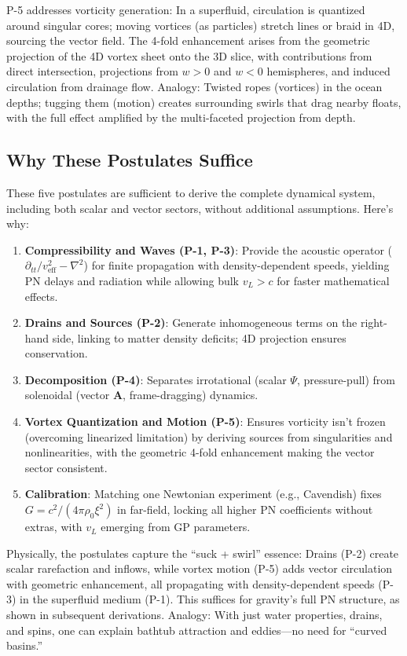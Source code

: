 \documentclass{article}
\begin{document}
P-5 addresses vorticity generation: In a superfluid, circulation is quantized around singular cores; moving vortices (as particles) stretch lines or braid in 4D, sourcing the vector field. The 4-fold enhancement arises from the geometric projection of the 4D vortex sheet onto the 3D slice, with contributions from direct intersection, projections from $w>0$ and $w<0$ hemispheres, and induced circulation from drainage flow. Analogy: Twisted ropes (vortices) in the ocean depths; tugging them (motion) creates surrounding swirls that drag nearby floats, with the full effect amplified by the multi-faceted projection from depth.

\subsection{Why These Postulates Suffice}

These five postulates are sufficient to derive the complete dynamical system, including both scalar and vector sectors, without additional assumptions. Here's why:

\begin{enumerate}
    \item \textbf{Compressibility and Waves (P-1, P-3)}: Provide the acoustic operator ($\partial_{tt}/v_{\text{eff}}^2 - \nabla^2$) for finite propagation with density-dependent speeds, yielding PN delays and radiation while allowing bulk $v_L > c$ for faster mathematical effects.
    \item \textbf{Drains and Sources (P-2)}: Generate inhomogeneous terms on the right-hand side, linking to matter density deficits; 4D projection ensures conservation.
    \item \textbf{Decomposition (P-4)}: Separates irrotational (scalar $\Psi$, pressure-pull) from solenoidal (vector $\mathbf{A}$, frame-dragging) dynamics.
    \item \textbf{Vortex Quantization and Motion (P-5)}: Ensures vorticity isn't frozen (overcoming linearized limitation) by deriving sources from singularities and nonlinearities, with the geometric 4-fold enhancement making the vector sector consistent.
    \item \textbf{Calibration}: Matching one Newtonian experiment (e.g., Cavendish) fixes $G = c^2 / (4\pi \rho_0 \xi^2)$ in far-field, locking all higher PN coefficients without extras, with $v_L$ emerging from GP parameters.
\end{enumerate}

Physically, the postulates capture the ``suck + swirl'' essence: Drains (P-2) create scalar rarefaction and inflows, while vortex motion (P-5) adds vector circulation with geometric enhancement, all propagating with density-dependent speeds (P-3) in the superfluid medium (P-1). This suffices for gravity's full PN structure, as shown in subsequent derivations. Analogy: With just water properties, drains, and spins, one can explain bathtub attraction and eddies---no need for ``curved basins.''
\end{document}
